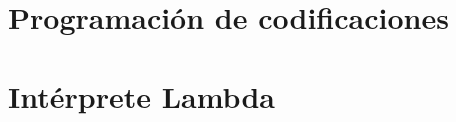 \documentclass[letterpaper, twoside, openright, 11pt]{book}
\theoremstyle{plain}%
\theoremstyle{definition}
\theoremstyle{remark}
\begin{document}
\appendix

\chapter{Programación de codificaciones}
\label{ap:lambda-scheme}


\chapter{Intérprete Lambda}
\label{ap:lambda}



\nocite{*}

\thispagestyle{empty}
{\small
}
\end{document}
